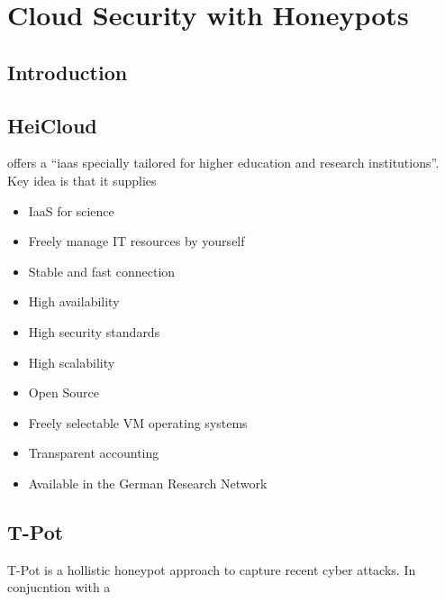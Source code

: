 \chapter{Cloud Security with Honeypots}

\section{Introduction}


\citet{Nithin2012}

\citet{Kelly2021}

\section{HeiCloud}

\citet{urz2021} offers a \enquote{\ac{iaas} specially tailored for higher education and research institutions}.
Key idea is that it supplies 

\cite{heicloud2021}

\begin{itemize}
    \item IaaS for science
    \item Freely manage IT resources by yourself
    \item Stable and fast connection
    \item High availability
    \item High security standards
    \item High scalability
    \item Open Source
    \item Freely selectable VM operating systems
    \item Transparent accounting
    \item Available in the German Research Network
\end{itemize}

\section{T-Pot}

T-Pot is a hollistic honeypot approach to capture recent cyber attacks. 
In conjucntion with a

